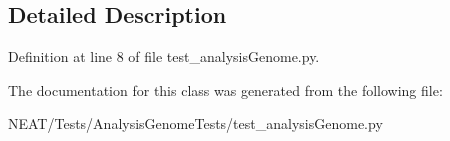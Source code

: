 \subsection{Detailed Description}


Definition at line 8 of file test\+\_\+analysis\+Genome.\+py.



The documentation for this class was generated from the following file\+:\begin{DoxyCompactItemize}
\item 
N\+E\+A\+T/\+Tests/\+Analysis\+Genome\+Tests/test\+\_\+analysis\+Genome.\+py\end{DoxyCompactItemize}
